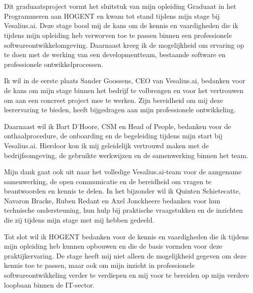 \chapter*{}%
\label{ch:voorwoord}
Dit graduaatsproject vormt het sluitstuk van mijn opleiding Graduaat in het
Programmeren aan HOGENT en kwam tot stand tijdens mijn stage bij Vesalius.ai.
Deze stage bood mij de kans om de kennis en vaardigheden die ik tijdens mijn
opleiding heb verworven toe te passen binnen een professionele
softwareontwikkelomgeving. Daarnaast kreeg ik de mogelijkheid om ervaring
op te doen met de werking van een developmentteam, bestaande software en
professionele ontwikkelprocessen.

Ik wil in de eerste plaats Sander Goossens, CEO van Vesalius.ai, bedanken
voor de kans om mijn stage binnen het bedrijf te volbrengen en voor het
vertrouwen om aan een concreet project mee te werken. Zijn bereidheid om
mij deze leerervaring te bieden, heeft bijgedragen aan mijn professionele
ontwikkeling.

Daarnaast wil ik Bart D'Hoore, CSM en Head of People, bedanken voor de
onthaalprocedure, de onboarding en de begeleiding tijdens mijn start bij
Vesalius.ai. Hierdoor kon ik mij geleidelijk vertrouwd maken met de
bedrijfsomgeving, de gebruikte werkwijzen en de samenwerking binnen het team.

Mijn dank gaat ook uit naar het volledige Vesalius.ai-team voor de aangename
samenwerking, de open communicatie en de bereidheid om vragen te beantwoorden
en kennis te delen. In het bijzonder wil ik Quinten Schietecatte,
Navaron Bracke, Ruben Redant en Axel Jonckheere bedanken voor hun technische
ondersteuning, hun hulp bij praktische vraagstukken en de inzichten die zij
tijdens mijn stage met mij hebben gedeeld.

Tot slot wil ik HOGENT bedanken voor de kennis en vaardigheden die ik tijdens
mijn opleiding heb kunnen opbouwen en die de basis vormden voor deze
praktijkervaring. De stage heeft mij niet alleen de mogelijkheid gegeven om
deze kennis toe te passen, maar ook om mijn inzicht in professionele
softwareontwikkeling verder te verdiepen en mij voor te bereiden op mijn
verdere loopbaan binnen de IT-sector.
